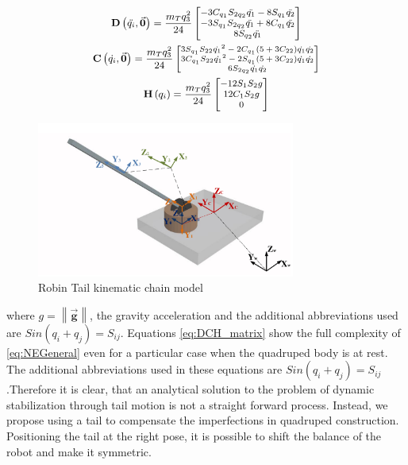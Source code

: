 \begin{gather}\label{eq:DCH_matrix}
\small
\mathbf{D}\left ( \ddot{q_i},\vec{\boldsymbol{0}} \right )=\frac{m_T q_3^2}{24}\begin{bmatrix}
-3C_{q_1}S_{2q_2}\ddot{q_1} -8S_{q_1}\ddot{q_2}\\ -3S_{q_1}S_{2q_2}\ddot{q_1} +8C_{q_1}\ddot{q_2} \\ 8S_{q_2}\ddot{q_1}
\end{bmatrix} \\
\footnotesize
\mathbf{C}\left ( \dot{q_i},\vec{\boldsymbol{0}} \right )=\frac{m_T q_3^2}{24} \begin{bmatrix}
3S_{q_1}S_{22}{\dot{q_1}}^2-2C_{q_1}(5+3C_{22})\dot{q_1}\dot{q_2}\\ 
3C_{q_1}S_{22}{\dot{q_1}}^2-2S_{q_1}(5+3C_{22})\dot{q_1}\dot{q_2}\\ 
6S_{2q_2}\dot{q_1}\dot{q_2}
\end{bmatrix}\\
\small
\mathbf{H}\left ( {q_i} \right )=\frac{m_T q_3^2}{24} \begin{bmatrix}
-12S_1S_2g\\ 
12C_1S_2g\\ 
0
\end{bmatrix}
\normalsize
\end{gather}

\begin{figure}
	\centering
	\includegraphics[width=85mm]{./pictures/RobinRepic.pdf}
	\caption{Robin Tail kinematic chain model}
	\label{fig:rmax}
\end{figure}

where $g=\left \| \vec{\mathbf{g}} \right \|$, the gravity acceleration and the additional abbreviations used are $Sin(q_i+q_j)=S_{ij}$. Equations \eqref{eq:DCH_matrix} show the full complexity of \eqref{eq:NEGeneral} even for a particular case when the quadruped body is at rest. The additional abbreviations used in these equations are $Sin(q_i+q_j)=S_{ij}$.Therefore it is clear, that an analytical solution to the problem of dynamic stabilization through tail motion is not a straight forward process. Instead, we propose using a tail to compensate the imperfections in quadruped construction. Positioning the tail at the right pose, it is possible to shift the balance of the robot and make it symmetric. 
